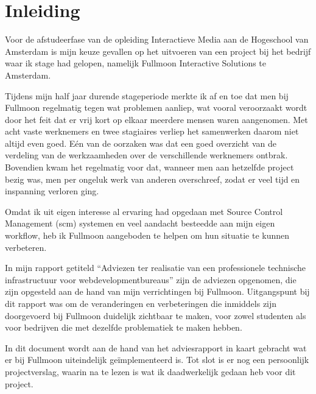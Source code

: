\chapter{Inleiding}

Voor de afstudeerfase van de opleiding Interactieve Media aan de Hogeschool van Amsterdam is mijn keuze gevallen op het uitvoeren van een project bij het bedrijf waar ik stage had gelopen, namelijk Fullmoon Interactive Solutions te Amsterdam.

Tijdens mijn half jaar durende stageperiode merkte ik af en toe dat men bij Fullmoon regelmatig tegen wat problemen aanliep, wat vooral veroorzaakt wordt door het feit dat er vrij kort op elkaar meerdere mensen waren aangenomen. Met acht vaste werknemers en twee stagiaires verliep het samenwerken daarom niet altijd even goed. Eén van de oorzaken was dat een goed overzicht van de verdeling van de werkzaamheden over de verschillende werknemers ontbrak. Bovendien kwam het regelmatig voor dat, wanneer men aan hetzelfde project bezig was, men per ongeluk werk van anderen overschreef, zodat er veel tijd en inspanning verloren ging.

Omdat ik uit eigen interesse al ervaring had opgedaan met Source Control Management  ({\sc scm}) systemen en veel aandacht besteedde aan mijn eigen workflow, heb ik Fullmoon aangeboden te helpen om hun situatie te kunnen verbeteren.

In mijn rapport getiteld ``Adviezen ter realisatie van een professionele technische infrastructuur voor webdevelopmentbureaus'' zijn de adviezen opgenomen, die zijn opgesteld aan de hand van mijn verrichtingen bij Fullmoon. Uitgangspunt bij dit rapport was om de veranderingen en verbeteringen die inmiddels zijn doorgevoerd bij Fullmoon duidelijk zichtbaar te maken, voor zowel studenten als voor bedrijven die met dezelfde problematiek te maken hebben.

In dit document wordt aan de hand van het adviesrapport in kaart gebracht wat er bij Fullmoon uiteindelijk geïmplementeerd is. Tot slot is er nog een persoonlijk projectverslag, waarin na te lezen is wat ik daadwerkelijk gedaan heb voor dit project.
